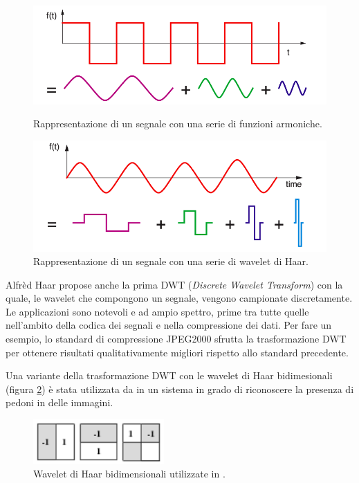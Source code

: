         \begin{figure}[!htb]
            \includegraphics[width=\linewidth]{img/fourier_rapresentation.png}
            \caption{Rappresentazione di un segnale con una serie di funzioni armoniche.}
            \label{fig:awesome_image1}
            \endminipage\hfill
            \includegraphics[width=\linewidth]{img/haar_rapresentation.png}
            \caption{Rappresentazione di un segnale con una serie di wavelet di Haar.}
            \label{fig:awesome_image2}
            \endminipage
        \end{figure}

        Alfrèd Haar propose anche la prima DWT (\emph{Discrete Wavelet Transform}) con la quale, le wavelet che compongono un segnale, vengono campionate discretamente.
        Le applicazioni sono notevoli e ad ampio spettro, prime tra tutte quelle nell'ambito della codica dei segnali e nella compressione dei dati. Per fare un esempio, lo standard di compressione JPEG2000 sfrutta la trasformazione DWT \cite{Jpeg2000} per ottenere risultati qualitativamente migliori rispetto allo standard precedente.

        Una variante della trasformazione DWT con le wavelet di Haar bidimesionali (figura \ref{fig:haar_wavelet}) è stata utilizzata da \citet{Oren97} in un sistema in grado di riconoscere la presenza di pedoni in delle immagini.

        \begin{figure}
            \centering
            \includegraphics[width=5cm]{img/haar_wavelet.png}
            \caption{Wavelet di Haar bidimensionali utilizzate in \cite{Oren97}.}
            \label{fig:haar_wavelet}
        \end{figure}

